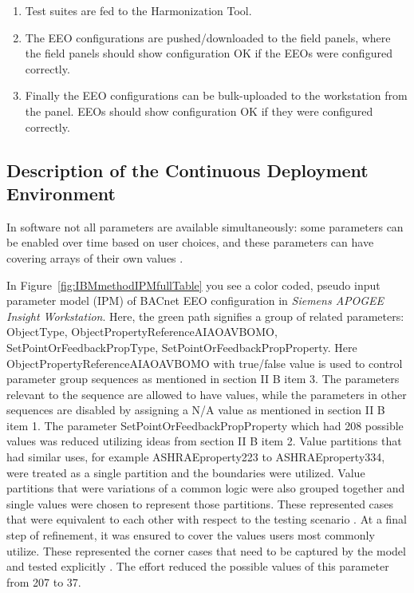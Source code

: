 \documentclass[conference]{IEEEtran}
\begin{document}
	\begin{enumerate}
		\item Test suites are fed to the Harmonization Tool. 
		\item The EEO configurations are pushed/downloaded to the field panels, where the field
		panels should show configuration OK if the EEOs were configured correctly. 		
		\item Finally the EEO configurations can be bulk-uploaded to the workstation from the panel.
		EEOs should show configuration OK if they were configured correctly. 
	\end{enumerate}


	\subsection{Description of the Continuous Deployment Environment }
  In software not all parameters are available simultaneously:
	some parameters can be enabled over time based on user choices,
	and these parameters can have covering arrays of their own values \cite{kuhn2008practical}. 
	
	In Figure~\ref{fig:IBMmethodIPMfullTable} you see a color coded, pseudo input parameter model (IPM) of BACnet EEO configuration in
	\textit{Siemens APOGEE Insight Workstation}. Here, the green path signifies
	a group of related parameters: ObjectType, ObjectPropertyReferenceAIAOAVBOMO,
	SetPointOrFeedbackPropType, SetPointOrFeedbackPropProperty.
	Here ObjectPropertyReferenceAIAOAVBOMO with true/false value is used
	to control parameter group sequences as mentioned in section II B item 3.
	The parameters relevant to the sequence are allowed to have values, 
	while the parameters in other sequences are disabled by assigning 
	a N/A value as mentioned in section II B item 1.
	The parameter SetPointOrFeedbackPropProperty
	which had 208 possible values was reduced utilizing ideas from section II B item 2.
	Value partitions that had similar uses, for example ASHRAEproperty223 to ASHRAEproperty334, were treated as a single partition and the boundaries were utilized.
	Value partitions that were variations of a common logic were also grouped together and single values were chosen to represent those partitions.
	These represented cases that were equivalent to each other with respect to the testing scenario \cite{segall2012common}.
	At a final step of refinement, it was ensured to cover the values users most commonly utilize.
  These represented the corner cases that need to be captured by the model and tested explicitly \cite{segall2012common}.
	The effort reduced the possible values of this parameter from 207 to 37.
\end{document}
